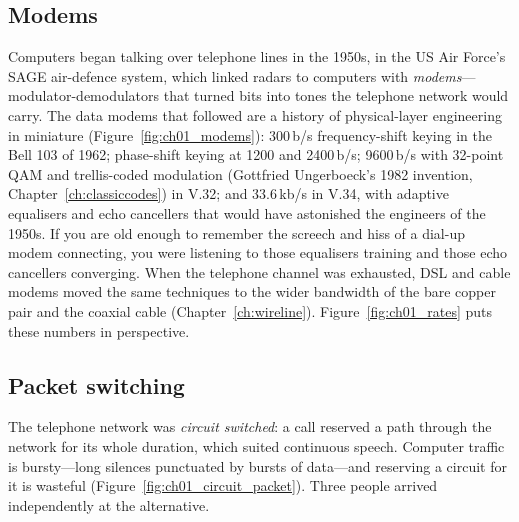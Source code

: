 \subsection{Modems}

Computers began talking over telephone lines in the 1950s, in the US Air Force's SAGE air-defence
system, which linked radars to computers with \emph{modems}---modulator-demodulators that turned bits
into tones the telephone network would carry. The data modems that followed are a history of
physical-layer engineering in miniature (Figure~\ref{fig:ch01_modems}): 300\,b/s frequency-shift keying in
the Bell 103 of 1962; phase-shift keying at 1200 and 2400\,b/s; 9600\,b/s with 32-point QAM and
trellis-coded modulation (Gottfried Ungerboeck's 1982 invention, Chapter~\ref{ch:classiccodes}) in V.32;
and 33.6\,kb/s in V.34, with adaptive equalisers and echo cancellers that would have astonished the
engineers of the 1950s. If you are old enough to remember the screech and hiss of a dial-up modem
connecting, you were listening to those equalisers training and those echo cancellers converging. When
the telephone channel was exhausted, DSL and cable modems moved the same techniques to the wider
bandwidth of the bare copper pair and the coaxial cable (Chapter~\ref{ch:wireline}).
Figure~\ref{fig:ch01_rates} puts these numbers in perspective.


\subsection{Packet switching}

The telephone network was \emph{circuit switched}: a call reserved a path through
the network for its whole duration, which suited continuous speech. Computer traffic is bursty---long
silences punctuated by bursts of data---and reserving a circuit for it is wasteful
(Figure~\ref{fig:ch01_circuit_packet}). Three people arrived independently at the alternative.


